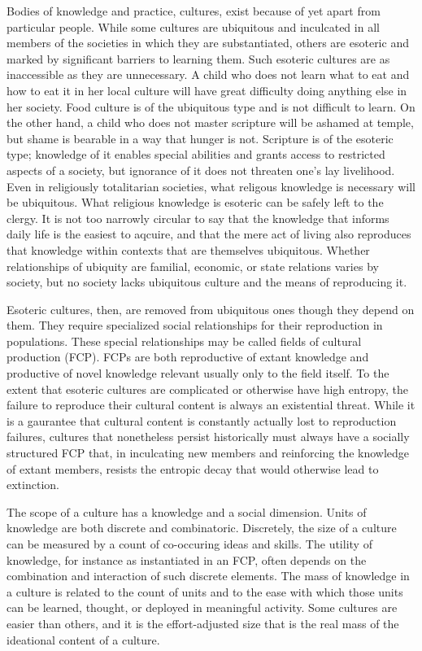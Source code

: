 \documentclass[]{book}
\theoremstyle{definition}
\theoremstyle{definition}
\theoremstyle{definition}
\theoremstyle{remark}
\begin{document}
Bodies of knowledge and practice, cultures, exist because of yet apart
from particular people. While some cultures are ubiquitous and
inculcated in all members of the societies in which they are
substantiated, others are esoteric and marked by significant barriers to
learning them. Such esoteric cultures are as inaccessible as they are
unnecessary. A child who does not learn what to eat and how to eat it in
her local culture will have great difficulty doing anything else in her
society. Food culture is of the ubiquitous type and is not difficult to
learn. On the other hand, a child who does not master scripture will be
ashamed at temple, but shame is bearable in a way that hunger is not.
Scripture is of the esoteric type; knowledge of it enables special
abilities and grants access to restricted aspects of a society, but
ignorance of it does not threaten one's lay livelihood. Even in
religiously totalitarian societies, what religous knowledge is necessary
will be ubiquitous. What religious knowledge is esoteric can be safely
left to the clergy. It is not too narrowly circular to say that the
knowledge that informs daily life is the easiest to aqcuire, and that
the mere act of living also reproduces that knowledge within contexts
that are themselves ubiquitous. Whether relationships of ubiquity are
familial, economic, or state relations varies by society, but no society
lacks ubiquitous culture and the means of reproducing it.

Esoteric cultures, then, are removed from ubiquitous ones though they
depend on them. They require specialized social relationships for their
reproduction in populations. These special relationships may be called
fields of cultural production (FCP). FCPs are both reproductive of
extant knowledge and productive of novel knowledge relevant usually only
to the field itself. To the extent that esoteric cultures are
complicated or otherwise have high entropy, the failure to reproduce
their cultural content is always an existential threat. While it is a
gaurantee that cultural content is constantly actually lost to
reproduction failures, cultures that nonetheless persist historically
must always have a socially structured FCP that, in inculcating new
members and reinforcing the knowledge of extant members, resists the
entropic decay that would otherwise lead to extinction.

The scope of a culture has a knowledge and a social dimension. Units of
knowledge are both discrete and combinatoric. Discretely, the size of a
culture can be measured by a count of co-occuring ideas and skills. The
utility of knowledge, for instance as instantiated in an FCP, often
depends on the combination and interaction of such discrete elements.
The mass of knowledge in a culture is related to the count of units and
to the ease with which those units can be learned, thought, or deployed
in meaningful activity. Some cultures are easier than others, and it is
the effort-adjusted size that is the real mass of the ideational content
of a culture.
\end{document}
